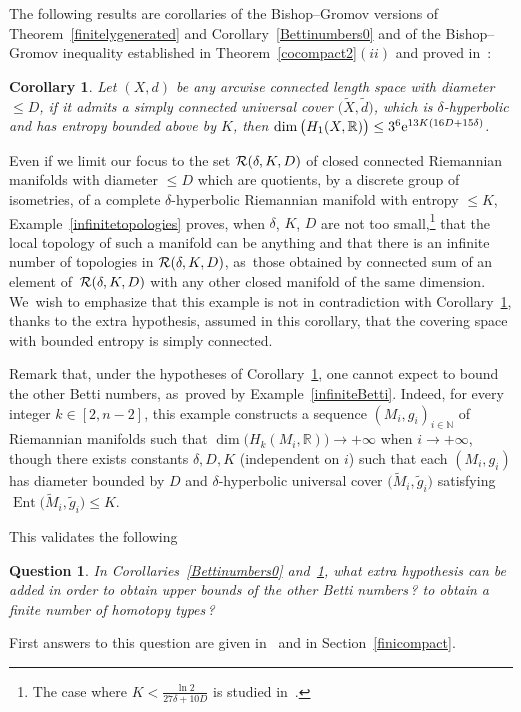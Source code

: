 \documentclass[pdftex]{sigma}
\numberwithin{equation}{section}
\newtheorem{Corollary}[theor]{Corollary}
\newtheorem{question}[theor]{Question}
\newcommand{\N}{\mathbb{N}}
\newcommand{\R}{\mathbb{R}}
\newcommand{\f}{\rightarrow}
\newcommand{\Ent}{\operatorname{Ent}}
\begin{document}
The following results are corollaries of the Bishop--Gromov versions of Theorem~\ref{finitelygenerated} and Corollary~\ref{Bettinumbers0} and of the
 Bishop--Gromov inequality established in Theorem~\ref{cocompact2}$(ii)$ and proved in~\cite[Theorem~5.1]{BCGS}:

\begin{Corollary}\label{Bettinumbers}
Let $(X,d)$ be any arcwise connected length space with diameter $\le D$, if it admits a simply connected universal cover $ \big(\widetilde X, \tilde d\big)$, which is $\delta$-hyperbolic
and has entropy bounded above by $K$, then $\dim \big( H_1 (X, \R) \big) \le 3^6 {\rm e}^{13 K (16 D + 15 \delta)}$.
\end{Corollary}
Even if we limit our focus to the set ${\cal R} (\delta, K, D)$ of closed connected Riemannian manifolds with diameter $\le D$ which are quotients, by a discrete
group of isometries, of a complete $\delta$-hyperbolic Riemannian manifold with entropy $\le K$, Example~\ref{infinitetopologies} proves, when $\delta$, $K$, $D$
are not too small,\footnote{The case where $K < \frac{\ln 2}{27 \delta + 10 D}$ is studied in~\cite[Section~5.2.2]{BCGS}.} that the local topology of such a
manifold can be anything and that there is an infinite number of topologies in ${\cal R} (\delta, K, D)$, as~those obtained by connected sum of an element of~${\cal R} (\delta, K, D)$ with any other closed manifold of
the same dimension. We~wish to emphasize that this example is not in contradiction with Corollary~\ref{Bettinumbers}, thanks to the extra hypothesis, assumed in this
corollary, that the covering space with bounded entropy is simply connected.

{\sloppy
Remark that, under the hypotheses of Corollary~\ref{Bettinumbers}, one cannot expect to bound the other Betti numbers, as~proved by Example~\ref{infiniteBetti}. Indeed, for every integer $k \in [2, n-2]$, this example constructs a sequence $(M_i, g_i)_{i \in \N} $ of Riemannian
manifolds such that $\dim \big( H_k (M_i, \R) \big) \f + \infty$ when $i \f +\infty$, though there exists constants $\delta, D, K$ (independent on $i$) such that each $(M_i, g_i)$ has diameter bounded by $ D$ and $\delta$-hyperbolic universal cover $\big(\widetilde M_i, \tilde g_i\big) $ satisfying
\mbox{$ \Ent \big(\widetilde M_i, \tilde g_i\big) \le K$}.

}

This validates the following
\begin{question}
In Corollaries~\ref{Bettinumbers0} and~\ref{Bettinumbers}, what extra hypothesis can be added in order to obtain upper bounds of
the other Betti numbers\,? to obtain a finite number of homotopy types\,?
\end{question}
First answers to this question are given in~\cite{BCGS2} and in Section~\ref{finicompact}.
\end{document}
